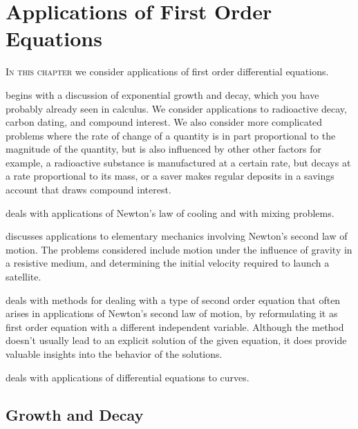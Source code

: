 
\chapter{Applications of First Order Equations}\label{ch:apps_first}

\textsc{In this chapter} we consider applications of first order differential
equations.

\medskip\noindent
{} begins with a discussion of
exponential growth and decay, which you have probably already seen in
calculus. We consider applications to radioactive decay, carbon
dating, and compound interest.
We also consider more complicated problems
where the rate of change of a quantity is in part proportional to
the magnitude of the quantity, but is also influenced by other
other factors   for example, a radioactive substance is manufactured
at a certain
rate, but decays at a rate proportional to its mass, or a saver
makes regular deposits in a savings account that draws compound
interest.


\medskip\noindent
{} deals with applications of
Newton's law of cooling and with mixing problems.


\medskip\noindent
{} discusses
applications to elementary mechanics involving Newton's second law
of motion. The problems considered include motion under the influence
of gravity in a resistive medium, and
determining the initial velocity required to launch a satellite.


\medskip\noindent
{} deals with methods for
dealing  with a  type  of second order equation
that often arises in applications of Newton's second law of motion,
by reformulating
it as  first order equation with a different independent variable.
Although the method  doesn't usually lead to  an explicit
solution of the given equation, it does provide valuable insights into
the behavior of the solutions.

\medskip\noindent
{} deals with applications of
differential equations to curves.

\newpage


\section{Growth and Decay}\label{sec:growth_decay}

